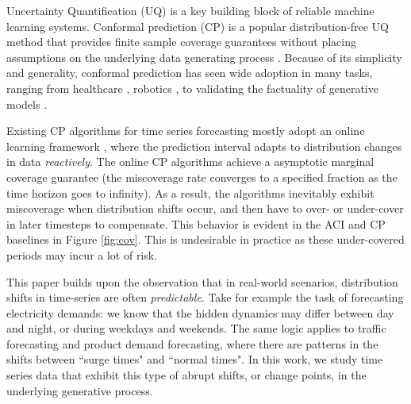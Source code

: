 

Uncertainty Quantification (UQ) is a key building block of reliable machine learning systems. Conformal prediction (CP) is a popular distribution-free UQ method that provides finite sample coverage guarantees without placing assumptions on the underlying data generating process \citep{vovk2005algorithmic, lei2018distribution}. Because of its simplicity and generality, conformal prediction has seen wide adoption in many tasks, ranging from  healthcare \cite{angelopoulos2022conformal},  robotics \cite{lindemann2023safe}, to validating the factuality of  generative models \cite{cherian2024large}.

Existing CP algorithms for time series forecasting mostly adopt an online learning framework \cite{gibbs2024conformal, angelopoulos2024pid}, where the prediction interval adapts to distribution changes in data \textit{reactively}. The online CP algorithms achieve a asymptotic marginal coverage guarantee (the miscoverage rate converges to a specified fraction as the time horizon goes to infinity). As a result, the algorithms inevitably exhibit miscoverage when distribution shifts occur, and then have to over- or under-cover in later timesteps to compensate. This behavior is evident in the ACI and CP baselines in Figure \ref{fig:cov}. This is undesirable in practice as these under-covered periods may incur a lot of risk.

This paper builds upon the observation that in real-world scenarios, distribution shifts in time-series are often \textit{predictable}. Take for example the task of forecasting electricity demands: we know that the hidden dynamics may differ between day and night, or during weekdays and weekends. The same logic applies to traffic forecasting and product demand forecasting, where there are patterns in the shifts between ``surge times" and ``normal times". In this work, we study time series data that exhibit this type of abrupt shifts, or change points, in the underlying generative process. 

